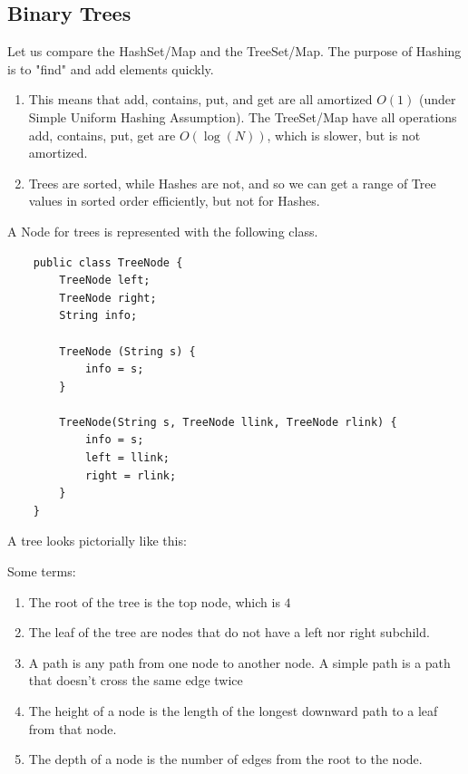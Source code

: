 \documentclass{article}
\begin{document}
  \subsection{Binary Trees} 

    Let us compare the HashSet/Map and the TreeSet/Map. The purpose of Hashing is to "find" and add elements quickly. 
    \begin{enumerate}
        \item This means that add, contains, put, and get are all amortized $O(1)$ (under Simple Uniform Hashing Assumption). The TreeSet/Map have all operations add, contains, put, get are $O(\log(N))$, which is slower, but is not amortized. 
        \item Trees are sorted, while Hashes are not, and so we can get a range of Tree values in sorted order efficiently, but not for Hashes. 
    \end{enumerate}

    A Node for trees is represented with the following class. 
    \begin{lstlisting}
    public class TreeNode {
        TreeNode left; 
        TreeNode right; 
        String info; 
        
        TreeNode (String s) {
            info = s; 
        }
        
        TreeNode(String s, TreeNode llink, TreeNode rlink) {
            info = s; 
            left = llink; 
            right = rlink; 
        }
    }
    \end{lstlisting}

    A tree looks pictorially like this: 
    \begin{center}
    \end{center}
    Some terms: 
    \begin{enumerate}
        \item The root of the tree is the top node, which is $4$
        \item The leaf of the tree are nodes that do not have a left nor right subchild. 
        \item A path is any path from one node to another node. A simple path is a path that doesn't cross the same edge twice 
        \item The height of a node is the length of the longest downward path to a leaf from that node. 
        \item The depth of a node is the number of edges from the root to the node. 
    \end{enumerate}
\end{document}
